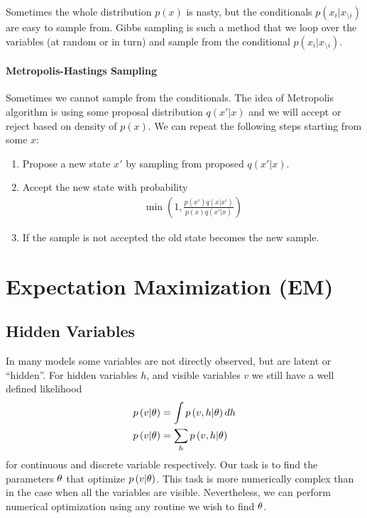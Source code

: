 Sometimes the whole distribution $p(x)$ is nasty, but the conditionals $p(x_i|x_{\setminus i})$ are easy to sample from. Gibbs sampling is such a method that we loop over the variables (at random or in turn) and sample from the conditional $p(x_i|x_{\setminus i})$.

\paragraph{Metropolis-Hastings Sampling}

Sometimes we cannot sample from the conditionals. The idea of Metropolis algorithm is using some proposal distribution $q(x'|x)$ and we will accept or reject based on density of $p(x)$. We can repeat the following steps starting from some $x$:
\begin{enumerate}
	\item Propose a new state $x'$ by sampling from proposed $q(x'|x)$.
	\item Accept the new state with probability
	\begin{align*}
	\min\left(1,\frac{p(x')q(x|x')}{p(x)q(x'|x)}\right)
	\end{align*}
	\item If the sample is not accepted the old state becomes the new sample.
\end{enumerate}



\section{Expectation Maximization (EM)}

\subsection{Hidden Variables}

In many models some variables are not directly observed, but are latent or ``hidden''. For hidden variables $h$, and visible variables $v$ we still have a well defined likelihood
\begin{align*}
	p\left(v|\theta\right)&=\int p\left(v,h|\theta\right)dh \\
	p\left(v|\theta\right)&=\sum_hp\left(v,h|\theta\right)
\end{align*}
for continuous and discrete variable respectively. Our task is to find the parameters $\theta$ that optimize $p\left(v|\theta\right)$. This task is more numerically complex than in the case when all the variables are visible. Nevertheless, we can perform numerical optimization using any routine we wish to find $\theta$.

